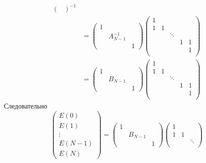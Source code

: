 \documentclass[12pt,a4paper]{article}
\begin{document}
\begin{enumproblem}
\begin{align*}
\begin{pmatrix}
            \end{pmatrix}^{-1}\\
            &=
            \begin{pmatrix}
                1\\
                & A_{N-1}^{-1}\\
                &&1
            \end{pmatrix}
            \begin{pmatrix}
                1\\
                1& 1\\
                && \ddots\\
                &&& 1& 1\\
                &&&& 1\\
            \end{pmatrix}\\
            &=
            \begin{pmatrix}
                1\\
                & B_{N-1}\\
                &&1
            \end{pmatrix}
            \begin{pmatrix}
                1\\
                1& 1\\
                && \ddots\\
                &&& 1& 1\\
                &&&& 1\\
            \end{pmatrix}
        \end{align*}
        Следовательно
        \[
            \begin{pmatrix}
                E(0)\\ E(1)\\ \vdots\\ E(N-1)\\ E(N)
            \end{pmatrix}
            =
            \begin{pmatrix}
                1\\
                & B_{N-1}\\
                &&1
            \end{pmatrix}
            \begin{pmatrix}
                1\\
                1& 1\\
                && \ddots\\

\end{pmatrix}\]
\end{enumproblem}
\end{document}
